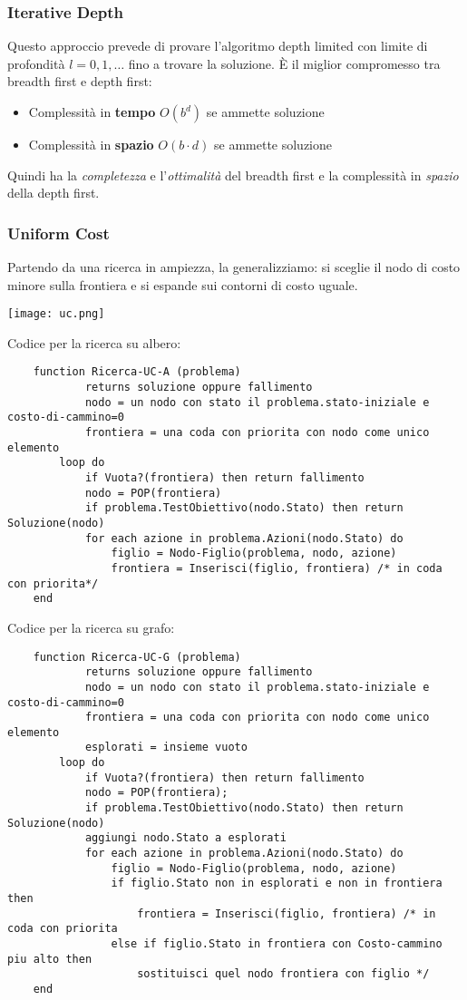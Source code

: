 \subsubsection{Iterative Depth}
Questo approccio prevede di provare l'algoritmo depth limited con limite di profondità $l=0, 1, \ldots$ fino a trovare la soluzione. È il miglior compromesso tra breadth first e depth first:
\begin{itemize}
	\item Complessità in \textbf{tempo} $O(b^d)$ se ammette soluzione
	\item Complessità in \textbf{spazio} $O(b \cdot d)$ se ammette soluzione
\end{itemize}
Quindi ha la \emph{completezza} e l'\emph{ottimalità} del breadth first e la complessità in \emph{spazio} della depth first.
\subsubsection{Uniform Cost}
Partendo da una ricerca in ampiezza, la generalizziamo: si sceglie il nodo di costo minore sulla frontiera e si espande sui contorni di costo uguale.
\begin{center}
	\texttt{[image: uc.png]}
\end{center}
\newpage
Codice per la ricerca su albero:
\begin{lstlisting}
	function Ricerca-UC-A (problema)
			returns soluzione oppure fallimento
			nodo = un nodo con stato il problema.stato-iniziale e costo-di-cammino=0
			frontiera = una coda con priorita con nodo come unico elemento
		loop do
			if Vuota?(frontiera) then return fallimento
			nodo = POP(frontiera)
			if problema.TestObiettivo(nodo.Stato) then return Soluzione(nodo)
			for each azione in problema.Azioni(nodo.Stato) do
				figlio = Nodo-Figlio(problema, nodo, azione)
				frontiera = Inserisci(figlio, frontiera) /* in coda con priorita*/
	end
\end{lstlisting}
Codice per la ricerca su grafo:
\begin{lstlisting}
	function Ricerca-UC-G (problema)
			returns soluzione oppure fallimento
			nodo = un nodo con stato il problema.stato-iniziale e costo-di-cammino=0
			frontiera = una coda con priorita con nodo come unico elemento
			esplorati = insieme vuoto
		loop do
			if Vuota?(frontiera) then return fallimento
			nodo = POP(frontiera);
			if problema.TestObiettivo(nodo.Stato) then return Soluzione(nodo)
			aggiungi nodo.Stato a esplorati
			for each azione in problema.Azioni(nodo.Stato) do
				figlio = Nodo-Figlio(problema, nodo, azione)
				if figlio.Stato non in esplorati e non in frontiera then
					frontiera = Inserisci(figlio, frontiera) /* in coda con priorita
				else if figlio.Stato in frontiera con Costo-cammino piu alto then
					sostituisci quel nodo frontiera con figlio */
	end
\end{lstlisting}
